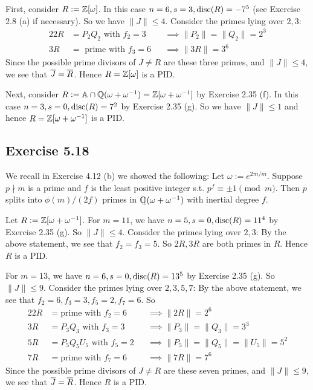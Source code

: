 \documentclass[../Marcus.tex]{subfiles}
\begin{document}
First, consider $R:=\mathbb{Z}[\omega]$. In this case $n=6,s=3,\operatorname{disc}(R) = -7^5$ (see Exercise 2.8 (a) if necessary). So we have $\|J\| \leq 4$. Consider the primes lying over $2,3$:
\begin{alignat*}{2}
2R &= P_2Q_2 \text{ with } f_2 = 3 &&\implies \|P_2\| = \|Q_2\| = 2^3    \\
3R &= \text{ prime with } f_3 = 6 &&\implies \|3R\| = 3^6
\end{alignat*}
Since the possible prime divisors of $J\neq R$ are these three primes, and $\|J\| \leq 4$, we see that $\overline{J}=\overline{R}$. Hence $R=\mathbb{Z}[\omega]$ is a PID.

Next, consider $R:=\mathbb{A}\cap\mathbb{Q}(\omega+\omega^{-1})=\mathbb{Z}[\omega+\omega^{-1}]$ by Exercise 2.35 (f). In this case $n=3,s=0,\operatorname{disc}(R) = 7^2$ by Exercise 2.35 (g). So we have $\|J\| \leq 1$ and hence $R=\mathbb{Z}[\omega+\omega^{-1}]$ is a PID.

\subsection*{Exercise 5.18}

We recall in Exercise 4.12 (b) we showed the following: Let $\omega:=e^{2\pi i/m}$. Suppose $p\nmid m$ is a prime and $f$ is the least positive integer s.t. $p^f \equiv \pm1\pmod{m}$. Then $p$ splits into $\phi(m)/(2f)$ primes in $\mathbb{Q}(\omega+\omega^{-1})$ with inertial degree $f$.

Let $R:=\mathbb{Z}[\omega+\omega^{-1}]$. For $m=11$, we have $n=5,s=0,\operatorname{disc}(R) = 11^4$ by Exercise 2.35 (g). So $\|J\| \leq 4$. Consider the primes lying over $2,3$: By the above statement, we see that $f_2=f_3=5$. So $2R,3R$ are both primes in $R$. Hence $R$ is a PID.

For $m=13$, we have $n=6,s=0,\operatorname{disc}(R) = 13^5$ by Exercise 2.35 (g). So $\|J\| \leq 9$. Consider the primes lying over $2,3,5,7$: By the above statement, we see that $f_2=6,f_3=3,f_5=2,f_7=6$. So
\begin{alignat*}{2}
2R &= \text{prime with } f_2 = 6     &&\implies \|2R\| = 2^6       \\
3R &= P_3Q_3 \text{ with } f_3=3  &&\implies \|P_3\|=\|Q_3\|=3^3       \\
5R &= P_5Q_5U_5 \text{ with } f_5=2  &&\implies \|P_5\|=\|Q_5\|=\|U_5\|=5^2     \\
7R &= \text{prime with } f_7 = 6     &&\implies \|7R\| = 7^6
\end{alignat*}
Since the possible prime divisors of $J\neq R$ are these seven primes, and $\|J\| \leq 9$, we see that $\overline{J}=\overline{R}$. Hence $R$ is a PID.
\end{document}
